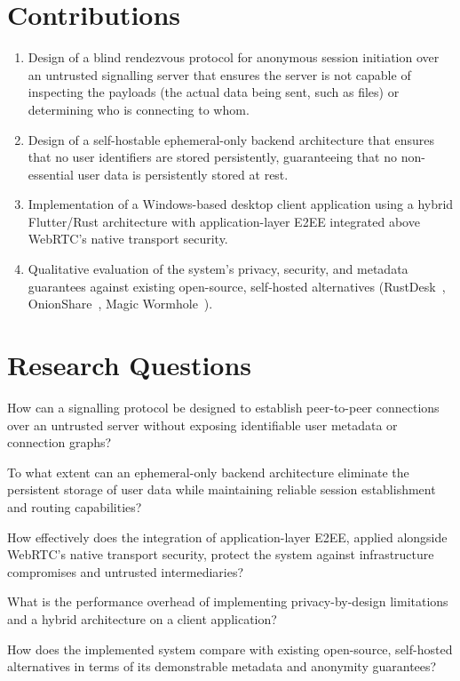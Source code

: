 \documentclass[12pt,a4paper,oneside]{report}
\begin{document}
\section{Contributions}
\label{sec:contributions}

\begin{enumerate}
  \item Design of a blind rendezvous protocol for anonymous session initiation over an untrusted signalling server that ensures the server is not capable of inspecting the payloads (the actual data being sent, such as files) or determining who is connecting to whom.

  \item Design of a self-hostable ephemeral-only backend architecture that ensures that no user identifiers are stored persistently, guaranteeing that no non-essential user data is persistently stored at rest.

  \item Implementation of a Windows-based desktop client application using a hybrid Flutter/Rust architecture with application-layer E2EE integrated above WebRTC's native transport security.

  \item Qualitative evaluation of the system's privacy, security, and metadata guarantees against existing open-source, self-hosted alternatives (RustDesk~\cite{rustdesk}, OnionShare~\cite{onionshare}, Magic Wormhole~\cite{magicwormhole}).
\end{enumerate}


\section{Research Questions}
\label{sec:rqs}

\begin{description}[style=nextline,font=\normalfont\bfseries]
  \item[RQ1] How can a signalling protocol be designed to establish peer-to-peer connections over an untrusted server without exposing identifiable user metadata or connection graphs?

  \item[RQ2] To what extent can an ephemeral-only backend architecture eliminate the persistent storage of user data while maintaining reliable session establishment and routing capabilities?

  \item[RQ3] How effectively does the integration of application-layer E2EE, applied alongside WebRTC's native transport security, protect the system against infrastructure compromises and untrusted intermediaries?

  \item[RQ4] What is the performance overhead of implementing privacy-by-design limitations and a hybrid architecture on a client application?

  \item[RQ5] How does the implemented system compare with existing open-source, self-hosted alternatives in terms of its demonstrable metadata and anonymity guarantees?
\end{description}
\end{document}
